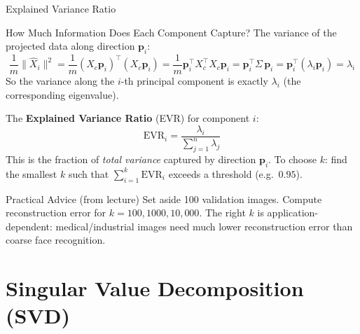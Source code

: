\documentclass{beamer}
\begin{document}
\begin{frame}[shrink=10]{Explained Variance Ratio}
  \begin{block}{How Much Information Does Each Component Capture?}
    The variance of the projected data along direction $\mathbf{p}_i$:
    \[
      \frac{1}{m}\|\hat{X}_i\|^2
        = \frac{1}{m}(X_c\mathbf{p}_i)^\top(X_c\mathbf{p}_i)
        = \frac{1}{m}\mathbf{p}_i^\top X_c^\top X_c\mathbf{p}_i
        = \mathbf{p}_i^\top \Sigma\,\mathbf{p}_i
        = \mathbf{p}_i^\top (\lambda_i\mathbf{p}_i)
        = \lambda_i
    \]
    So the variance along the $i$-th principal component is exactly
    $\lambda_i$ (the corresponding eigenvalue).

    \medskip

    The \textbf{Explained Variance Ratio} (EVR) for component $i$:
    \[
      \mathrm{EVR}_i
        = \frac{\lambda_i}{\sum_{j=1}^n \lambda_j}
    \]
    This is the fraction of \emph{total variance} captured by
    direction $\mathbf{p}_i$.
    To choose $k$: find the smallest $k$ such that
    $\sum_{i=1}^k \mathrm{EVR}_i$ exceeds a threshold (e.g.\ $0.95$).
  \end{block}

  \begin{alertblock}{Practical Advice (from lecture)}
    Set aside 100 validation images.
    Compute reconstruction error for $k = 100, 1000, 10{,}000$.
    The right $k$ is application-dependent: medical/industrial images
    need much lower reconstruction error than coarse face recognition.
  \end{alertblock}
\end{frame}

\section{Singular Value Decomposition (SVD)}
\end{document}
